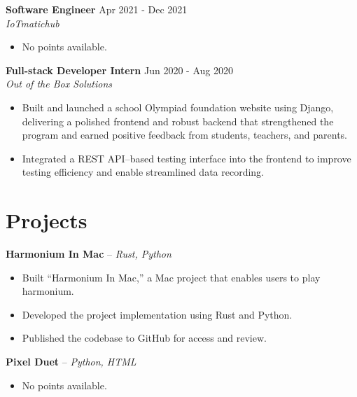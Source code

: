\documentclass[a4paper,10pt]{article}
\begin{document}
\vspace{-6pt}
\textbf{Software Engineer} \hfill Apr 2021 - Dec 2021 \\
\textit{IoTmatichub}
\begin{itemize}
\item No points available.
\end{itemize}
\vspace{-6pt}
\textbf{Full-stack Developer Intern} \hfill Jun 2020 - Aug 2020 \\
\textit{Out of the Box Solutions}
\begin{itemize}
\item Built and launched a school Olympiad foundation website using Django, delivering a polished frontend and robust backend that strengthened the program and earned positive feedback from students, teachers, and parents.
\item Integrated a REST API–based testing interface into the frontend to improve testing efficiency and enable streamlined data recording.
\end{itemize}


\vspace{-8pt}
\section*{Projects}
\vspace{-3pt}
\textbf{Harmonium In Mac} -- \textit{Rust, Python}
\begin{itemize}
    \item Built “Harmonium In Mac,” a Mac project that enables users to play harmonium.
\item Developed the project implementation using Rust and Python.
\item Published the codebase to GitHub for access and review.
\end{itemize}
\vspace{0pt}
\textbf{Pixel Duet} -- \textit{Python, HTML}
\begin{itemize}
    \item No points available.
\end{itemize}


\vspace{-8pt}
\end{document}
